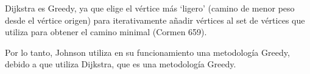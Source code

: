 \documentclass[../tp2_grupo404.tex]{subfiles}
\begin{document}
Dijkstra es Greedy, ya que elige el vértice más ‘ligero’ (camino de menor peso desde el vértice origen) para iterativamente añadir vértices al set de vértices que utiliza para obtener el camino minimal (Cormen 659). 

Por lo tanto, Johnson utiliza en su funcionamiento una metodología Greedy, debido a que utiliza Dijkstra, que es una metodología Greedy.

\end{document}
